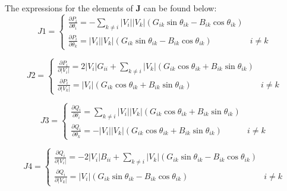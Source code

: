 \documentclass[12pt]{article}
\begin{document}
The expressions for the elements of $\mathbf{J}$ can be found below:
\begin{equation}\label{eq:J1} 
J1 =\left\{\begin{matrix}

\frac{\partial P_i}{\partial \theta_i} = -\sum_{k\ne i}{|V_i||V_k|\left (G_{ik}\sin\theta_{ik} - B_{ik}\cos\theta_{ik}\right )} &\\
\frac{\partial P_i}{\partial \theta_k} = |V_i||V_k|\left (G_{ik}\sin\theta_{ik} - B_{ik}\cos\theta_{ik}\right )    & i\ne k

\end{matrix}\right .
\end{equation} 


\begin{equation}\label{eq:J2}
J2 =\left\{\begin{matrix}

\frac{\partial P_i}{\partial |V_i|} = 2|V_i|G_{ii} + \sum_{k\ne i}{|V_k|  \left (G_{ik}\cos\theta_{ik} + B_{ik}\sin\theta_{ik}\right )} &\\
\frac{\partial P_i}{\partial |V_k|} = |V_i|\left ( G_{ik}\cos\theta_{ik} +  B_{ik}\sin\theta_{ik}\right )    & i\ne k

\end{matrix}\right  .
\end{equation} 


\begin{equation}\label{eq:J3}
J3 =\left\{\begin{matrix}

\frac{\partial Q_i}{\partial \theta_i} = \sum_{k\ne i}{|V_i||V_k|\left (G_{ik}\cos\theta_{ik} + B_{ik}\sin\theta_{ik}\right )} &\\
\frac{\partial Q_i}{\partial \theta_k} = -|V_i||V_k|\left (G_{ik}\cos\theta_{ik} + B_{ik}\sin\theta_{ik}\right )    & i\ne k

\end{matrix}\right .
\end{equation} 

\begin{equation}\label{eq:J4}
J4 =\left\{\begin{matrix}

\frac{\partial Q_i}{\partial |V_i|} = -2|V_i|B_{ii} + \sum_{k\ne i}{|V_k|  \left (G_{ik}\sin\theta_{ik} - B_{ik}\cos\theta_{ik}\right )} &\\
\frac{\partial Q_i}{\partial |V_k|} = |V_i|\left ( G_{ik}\sin\theta_{ik} -  B_{ik}\cos\theta_{ik}\right )    & i\ne k

\end{matrix}\right .
\end{equation} 
\end{document}
